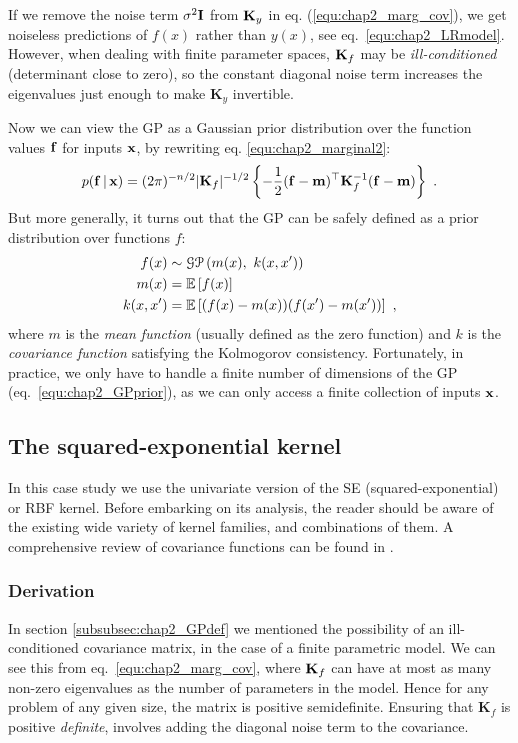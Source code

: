 	If we remove the noise term $\sigma^2 \mathbf{I}$ from $\mathbf{K}_y$ in eq.
	(\ref{equ:chap2_marg_cov}), we get noiseless predictions of $f(x)$ rather than
	$y(x)$, see eq.~\eqref{equ:chap2_LRmodel}. However, when dealing with finite
	parameter spaces, $\mathbf{K}_f$ may be \textit{ill-conditioned} (determinant close to zero), so the
	constant diagonal noise term increases the eigenvalues just enough to
	make $\mathbf{K}_y$ invertible.

	Now we can view the GP as a Gaussian prior distribution over
	the function values $\mathbf{f}$ for inputs $\mathbf{x}$, by rewriting eq. \eqref{equ:chap2_marginal2}:
	\begin{equation} \label{equ:chap2_GPprior}
	  p(\mathbf{f} \,|\, \mathbf{x}) = (2\pi)^{-n/2}\lvert \mathbf{K}_f \rvert^{-1/2}
	  \left\{-\frac{1}{2} (\mathbf{f}-\mathbf{m})^\top \mathbf{K}^{-1}_f (\mathbf{f}-\mathbf{m}) \right\} ~.
	\end{equation}
	But more generally, it turns out that the GP can be safely defined as a
	prior distribution over functions $f$: %
	\begin{align}
	   \nonumber f(x) &\sim \mathcal{GP} \left(m(x), ~ k(x, x') \right) \\
	  m(x) &= \mathbb{E}\left[f(x)\right] \\  \label{equ:GPcovfunc}
	  k(x, x') &= \mathbb{E}\left[(f(x)-m(x))(f(x')-m(x'))\right]~,
	\end{align}
	where $m$ is the \textit{mean function} (usually defined as the zero function) and
	$k$ is the \textit{covariance function} satisfying the Kolmogorov consistency.
	Fortunately, in practice, we only have to handle a finite number of dimensions of the GP (eq.~\ref{equ:chap2_GPprior}),
	as we can only access a finite collection of inputs $\mathbf{x}$.

    \subsection{The squared-exponential kernel} \label{subsec:chap2_covfunc}
      In this case study we use the univariate version of the SE (squared-exponential) or RBF
      kernel. Before embarking on its analysis, the reader should be aware
      of the existing wide variety of kernel families, and combinations of them.
      A comprehensive review of covariance functions can be found in \citep[chapter 4]{Rasmussen:book06}.

      \subsubsection{Derivation} %
	In section \ref{subsubsec:chap2_GPdef} we mentioned the possibility of an
	ill-conditioned covariance matrix, in the case of a finite parametric
	model. We can see this from eq.~\eqref{equ:chap2_marg_cov}, where $\mathbf{K}_f$ can have at most as many
	non-zero eigenvalues as the number of parameters in the model. Hence for any
	problem of any given size, the matrix is positive semidefinite. Ensuring that
	$\mathbf{K}_f$ is positive \textit{definite}, involves adding the diagonal noise term
	to the covariance.

